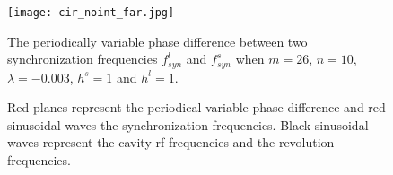 
\begin{figure}[!htb]
   \centering   
   \texttt{[image: cir\_noint\_far.jpg]}
   \caption{The periodically variable phase difference between two synchronization frequencies $f_{\mathit{syn}}^{l}$ and $f_{\mathit{syn}}^{s}$ when $m=26$, $n=10$, $\lambda=-0.003$, $h^s=1$ and $h^l=1$.}
	\caption*{Red planes represent the periodical variable phase difference and red sinusoidal waves the synchronization frequencies. Black sinusoidal waves represent the cavity rf frequencies and the revolution frequencies.}
   \label{cir_noint_far}
\end{figure} 




